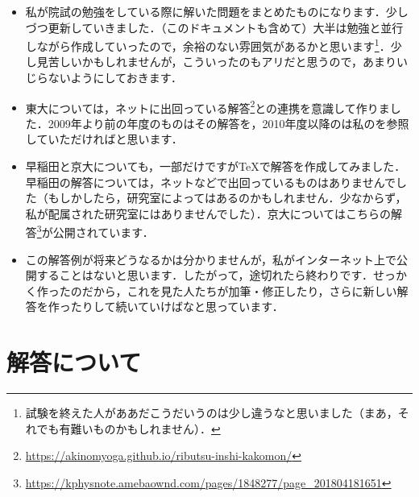 \documentclass[a4paper,pdflatex,ja=standard]{bxjsarticle}
\begin{document}
\begin{itemize}
  \item 
  私が院試の勉強をしている際に解いた問題をまとめたものになります．少しづつ更新していきました．（このドキュメントも含めて）大半は勉強と並行しながら作成していったので，余裕のない雰囲気があるかと思います\footnote{
    試験を終えた人がああだこうだいうのは少し違うなと思いました（まあ，それでも有難いものかもしれません）．
  }．少し見苦しいかもしれませんが，こういったのもアリだと思うので，あまりいじらないようにしておきます．

  \item 
  東大については，ネットに出回っている解答\footnote{
    \url{https://akinomyoga.github.io/ributsu-inshi-kakomon/}
  }との連携を意識して作りました．2009年より前の年度のものはその解答を，2010年度以降のは私のを参照していただければと思います．

  \item 
  早稲田と京大についても，一部だけですがTeXで解答を作成してみました．早稲田の解答については，ネットなどで出回っているものはありませんでした（もしかしたら，研究室によってはあるのかもしれません．少なからず，私が配属された研究室にはありませんでした）．京大についてはこちらの解答\footnote{
    \url{https://kphysnote.amebaownd.com/pages/1848277/page_201804181651}
  }が公開されています．

  \item 
  この解答例が将来どうなるかは分かりませんが，私がインターネット上で公開することはないと思います．したがって，途切れたら終わりです．せっかく作ったのだから，これを見た人たちが加筆・修正したり，さらに新しい解答を作ったりして続いていけばなと思っています．
\end{itemize}


\section{解答について}
\end{document}
